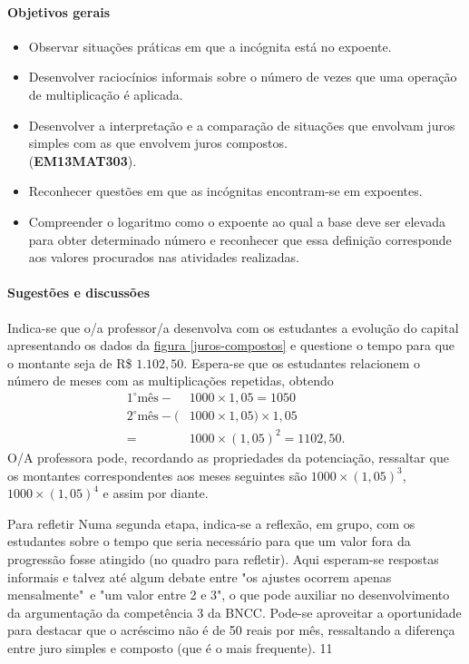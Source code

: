 \def\currentcolor{session1}
\begin{texto}
{
\paragraph{Objetivos gerais}
\begin{itemize}
\item Observar situações práticas em que a incógnita está no expoente.
\item Desenvolver raciocínios informais sobre o número de vezes que uma operação de multiplicação é aplicada.
\item Desenvolver a interpretação e a comparação de situações que envolvam juros simples com as que envolvem juros compostos. \\ (\textbf{EM13MAT303}).
\item Reconhecer questões em que as incógnitas encontram-se em expoentes.
\item Compreender o logaritmo como o expoente ao qual a base deve ser elevada para obter determinado número e reconhecer que essa definição corresponde aos valores procurados nas atividades realizadas.
\end{itemize}

\paragraph{Sugestões e discussões}

Indica-se que o/a professor/a desenvolva com os estudantes a evolução  do capital apresentando os dados da \hyperref[juros-compostos]{figura \ref{juros-compostos}} e questione o tempo para que o montante seja de R\$ $1.102{,}50$. Espera-se que os estudantes relacionem o número de meses com as multiplicações repetidas, obtendo
\begin{align*} 
1^{\circ} \mbox{m\^es} - &1000 \times 1,05 = 1050\\
2^{\circ} \mbox{m\^es} - (&1000 \times 1,05) \times 1,05\\
 = &1000 \times (1,05)^2 = 1102,50.
\end{align*}
O/A professora pode, recordando as propriedades da potenciação, ressaltar que os montantes correspondentes aos meses seguintes são 
$1000 \times (1,05)^3$, $1000 \times (1,05)^4$ e assim por diante.
}
\end{texto}
\begin{sugestions}{Para refletir}
{
	Numa segunda etapa, indica-se a reflexão, em grupo, com os estudantes sobre o tempo que seria necessário para que um valor fora da progressão fosse atingido (no quadro para refletir). Aqui esperam-se respostas informais e talvez até algum debate entre "os ajustes ocorrem apenas mensalmente"\, e "um valor entre 2 e 3", o que pode auxiliar no desenvolvimento da argumentação da competência 3 da BNCC. Pode-se aproveitar a oportunidade para destacar que o acréscimo não é de 50 reais por mês, ressaltando a diferença entre juro simples e composto (que é o mais frequente).
}{1}{1}
\end{sugestions}
